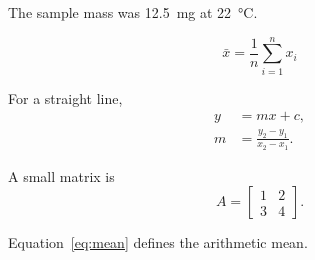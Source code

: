 \documentclass{article}
\begin{document}
The sample mass was \qty{12.5}{\milli\gram} at \qty{22}{\degreeCelsius}.

\begin{equation}
  \bar{x}=\frac{1}{n}\sum_{i=1}^{n}x_i
  \label{eq:mean}
\end{equation}

For a straight line,
\begin{align}
  y &= mx+c, \\
  m &= \frac{y_2-y_1}{x_2-x_1}.
\end{align}

A small matrix is
\[
  A=\begin{bmatrix}
    1 & 2 \\
    3 & 4
  \end{bmatrix}.
\]

Equation~\ref{eq:mean} defines the arithmetic mean.
\end{document}
